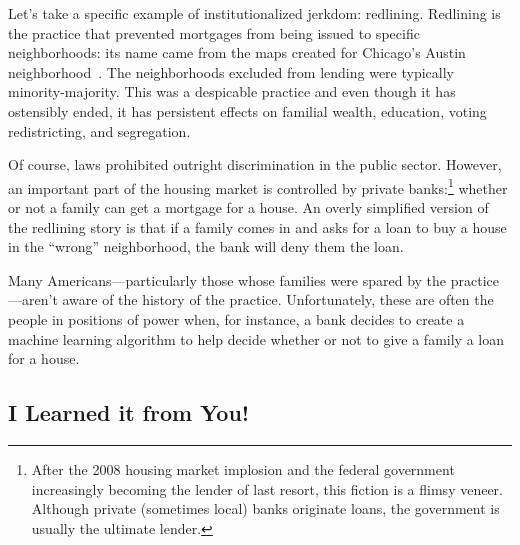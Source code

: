 Let's take a specific example of institutionalized jerkdom: redlining.
Redlining is the practice that prevented mortgages from being issued
to specific neighborhoods: its name came from the maps created for
Chicago's Austin neighborhood~\citep{pogge-92}.
The neighborhoods excluded from lending were typically minority-majority.
This was a despicable practice and even though it has ostensibly
ended, it has persistent effects on familial wealth, education, voting
redistricting, and segregation.

Of course, laws prohibited outright discrimination in the public
sector.  However, an important part of the housing market is
controlled by private banks:\footnote{After the 2008 housing market
  implosion and the federal government increasingly becoming the
  lender of last resort, this fiction is a flimsy veneer.  Although
  private (sometimes local) banks originate loans, the government is
  usually the ultimate lender.} whether or not a family can get a
mortgage for a house.  An overly simplified version of the redlining
story is that if a family comes in and asks for a loan to buy a house
in the ``wrong'' neighborhood, the bank will deny them the loan.

Many Americans---particularly those whose families were spared by the
practice---aren't aware of the history of the practice.
Unfortunately, these are often the people in positions of power when,
for instance, a bank decides to create a machine learning algorithm to
help decide whether or not to give a family a loan for a house.

\subsection{I Learned it from You!}


